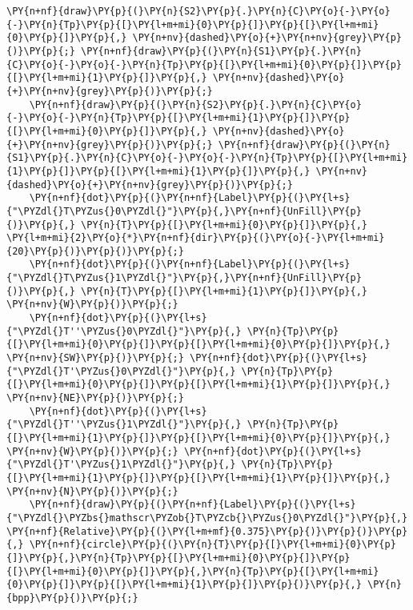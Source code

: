 \begin{Verbatim}[commandchars=\\\{\}]
    \PY{n+nf}{draw}\PY{p}{(}\PY{n}{S2}\PY{p}{.}\PY{n}{C}\PY{o}{-}\PY{o}{-}\PY{n}{Tp}\PY{p}{[}\PY{l+m+mi}{0}\PY{p}{]}\PY{p}{[}\PY{l+m+mi}{0}\PY{p}{]}\PY{p}{,} \PY{n+nv}{dashed}\PY{o}{+}\PY{n+nv}{grey}\PY{p}{)}\PY{p}{;} \PY{n+nf}{draw}\PY{p}{(}\PY{n}{S1}\PY{p}{.}\PY{n}{C}\PY{o}{-}\PY{o}{-}\PY{n}{Tp}\PY{p}{[}\PY{l+m+mi}{0}\PY{p}{]}\PY{p}{[}\PY{l+m+mi}{1}\PY{p}{]}\PY{p}{,} \PY{n+nv}{dashed}\PY{o}{+}\PY{n+nv}{grey}\PY{p}{)}\PY{p}{;}
    \PY{n+nf}{draw}\PY{p}{(}\PY{n}{S2}\PY{p}{.}\PY{n}{C}\PY{o}{-}\PY{o}{-}\PY{n}{Tp}\PY{p}{[}\PY{l+m+mi}{1}\PY{p}{]}\PY{p}{[}\PY{l+m+mi}{0}\PY{p}{]}\PY{p}{,} \PY{n+nv}{dashed}\PY{o}{+}\PY{n+nv}{grey}\PY{p}{)}\PY{p}{;} \PY{n+nf}{draw}\PY{p}{(}\PY{n}{S1}\PY{p}{.}\PY{n}{C}\PY{o}{-}\PY{o}{-}\PY{n}{Tp}\PY{p}{[}\PY{l+m+mi}{1}\PY{p}{]}\PY{p}{[}\PY{l+m+mi}{1}\PY{p}{]}\PY{p}{,} \PY{n+nv}{dashed}\PY{o}{+}\PY{n+nv}{grey}\PY{p}{)}\PY{p}{;}
    \PY{n+nf}{dot}\PY{p}{(}\PY{n+nf}{Label}\PY{p}{(}\PY{l+s}{"\PYZdl{}T\PYZus{}0\PYZdl{}"}\PY{p}{,}\PY{n+nf}{UnFill}\PY{p}{)}\PY{p}{,} \PY{n}{T}\PY{p}{[}\PY{l+m+mi}{0}\PY{p}{]}\PY{p}{,} \PY{l+m+mi}{2}\PY{o}{*}\PY{n+nf}{dir}\PY{p}{(}\PY{o}{-}\PY{l+m+mi}{20}\PY{p}{)}\PY{p}{)}\PY{p}{;}
    \PY{n+nf}{dot}\PY{p}{(}\PY{n+nf}{Label}\PY{p}{(}\PY{l+s}{"\PYZdl{}T\PYZus{}1\PYZdl{}"}\PY{p}{,}\PY{n+nf}{UnFill}\PY{p}{)}\PY{p}{,} \PY{n}{T}\PY{p}{[}\PY{l+m+mi}{1}\PY{p}{]}\PY{p}{,} \PY{n+nv}{W}\PY{p}{)}\PY{p}{;}
    \PY{n+nf}{dot}\PY{p}{(}\PY{l+s}{"\PYZdl{}T''\PYZus{}0\PYZdl{}"}\PY{p}{,} \PY{n}{Tp}\PY{p}{[}\PY{l+m+mi}{0}\PY{p}{]}\PY{p}{[}\PY{l+m+mi}{0}\PY{p}{]}\PY{p}{,} \PY{n+nv}{SW}\PY{p}{)}\PY{p}{;} \PY{n+nf}{dot}\PY{p}{(}\PY{l+s}{"\PYZdl{}T'\PYZus{}0\PYZdl{}"}\PY{p}{,} \PY{n}{Tp}\PY{p}{[}\PY{l+m+mi}{0}\PY{p}{]}\PY{p}{[}\PY{l+m+mi}{1}\PY{p}{]}\PY{p}{,} \PY{n+nv}{NE}\PY{p}{)}\PY{p}{;}
    \PY{n+nf}{dot}\PY{p}{(}\PY{l+s}{"\PYZdl{}T''\PYZus{}1\PYZdl{}"}\PY{p}{,} \PY{n}{Tp}\PY{p}{[}\PY{l+m+mi}{1}\PY{p}{]}\PY{p}{[}\PY{l+m+mi}{0}\PY{p}{]}\PY{p}{,} \PY{n+nv}{W}\PY{p}{)}\PY{p}{;} \PY{n+nf}{dot}\PY{p}{(}\PY{l+s}{"\PYZdl{}T'\PYZus{}1\PYZdl{}"}\PY{p}{,} \PY{n}{Tp}\PY{p}{[}\PY{l+m+mi}{1}\PY{p}{]}\PY{p}{[}\PY{l+m+mi}{1}\PY{p}{]}\PY{p}{,} \PY{n+nv}{N}\PY{p}{)}\PY{p}{;}
    \PY{n+nf}{draw}\PY{p}{(}\PY{n+nf}{Label}\PY{p}{(}\PY{l+s}{"\PYZdl{}\PYZbs{}mathscr\PYZob{}T\PYZcb{}\PYZus{}0\PYZdl{}"}\PY{p}{,} \PY{n+nf}{Relative}\PY{p}{(}\PY{l+m+mf}{0.375}\PY{p}{)}\PY{p}{)}\PY{p}{,} \PY{n+nf}{circle}\PY{p}{(}\PY{n}{T}\PY{p}{[}\PY{l+m+mi}{0}\PY{p}{]}\PY{p}{,}\PY{n}{Tp}\PY{p}{[}\PY{l+m+mi}{0}\PY{p}{]}\PY{p}{[}\PY{l+m+mi}{0}\PY{p}{]}\PY{p}{,}\PY{n}{Tp}\PY{p}{[}\PY{l+m+mi}{0}\PY{p}{]}\PY{p}{[}\PY{l+m+mi}{1}\PY{p}{]}\PY{p}{)}\PY{p}{,} \PY{n}{bpp}\PY{p}{)}\PY{p}{;}

\end{Verbatim}
